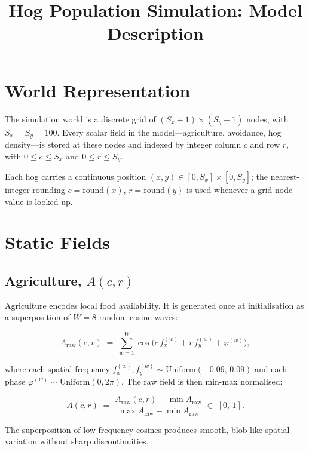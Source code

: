 \documentclass[11pt]{article}
\title{\textbf{Hog Population Simulation: Model Description}}
\date{}
\begin{document}
\maketitle

\tableofcontents
\bigskip

\section{World Representation}

The simulation world is a discrete grid of $(S_x + 1) \times (S_y + 1)$ nodes, with
$S_x = S_y = 100$.  Every scalar field in the model---agriculture, avoidance,
hog density---is stored at these nodes and indexed by integer column $c$ and
row $r$, with $0 \le c \le S_x$ and $0 \le r \le S_y$.

Each hog carries a continuous position $(x, y) \in [0, S_x] \times [0, S_y]$;
the nearest-integer rounding $c = \mathrm{round}(x)$, $r = \mathrm{round}(y)$
is used whenever a grid-node value is looked up.

\section{Static Fields}

\subsection{Agriculture, $A(c,r)$}

Agriculture encodes local food availability.  It is generated once at
initialisation as a superposition of $W = 8$ random cosine waves:

\[
  A_{\mathrm{raw}}(c,r)
  \;=\; \sum_{w=1}^{W}
        \cos\!\bigl(c\,f_x^{(w)} + r\,f_y^{(w)} + \varphi^{(w)}\bigr),
\]

where each spatial frequency $f_x^{(w)}, f_y^{(w)} \sim \mathrm{Uniform}(-0.09,\,0.09)$
and each phase $\varphi^{(w)} \sim \mathrm{Uniform}(0, 2\pi)$.  The raw field is
then min-max normalised:

\[
  A(c,r) \;=\; \frac{A_{\mathrm{raw}}(c,r) - \min A_{\mathrm{raw}}}
                    {\max A_{\mathrm{raw}} - \min A_{\mathrm{raw}}}
  \;\in\; [0,\,1].
\]

The superposition of low-frequency cosines produces smooth, blob-like spatial
variation without sharp discontinuities.
\end{document}
